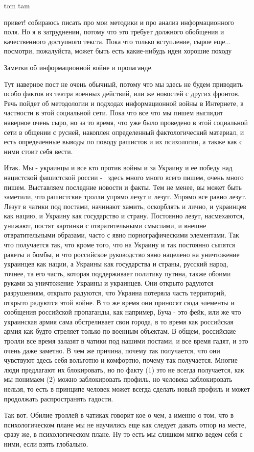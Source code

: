  
 
 
 
 

tom tam

привет! собираюсь писать про мои методики и про анализ информационного поля. Но
я в затруднении, потому что это требует должного обобщения и качественного
доступного текста. Пока что только вступление, сырое еще... посмотри,
пожалуйста, может быть есть какие-нибудь идеи хорошие походу

Заметки об информационной войне и пропаганде.

Тут наверное пост не очень обычный, потому что мы здесь не будем приводить
особо фактов из театра военных действий, или же новостей с других фронтов. Речь
пойдет об методологии и подходах информационной войны в Интернете, в частности
в этой социальной сети. Пока что все что мы пишем выглядит наверное очень сыро,
но за то время, что уже было проведено в этой социальной сети в общении с
русней, накоплен определенный фактологический материал, и есть определенные
выводы по поводу рашистов и их психологии, а также как с ними стоит себя
вести.

Итак. Мы - украинцы и все кто против войны и за Украину и ее победу над
нацистской фашистской россии -  здесь много много всего пишем, очень много
пишем. Выставляем последние новости и факты. Тем не менее, вы может быть
заметили, что рашистские тролли упрямо лезут и лезут. Упрямо
все равно лезут. Лезут в чатики под постами, начинают хамить, оскорблять и
лично, и украинцев как нацию, и Украину как государство и страну. Постоянно
лезут, насмехаются, унижают, постят картинки с отвратительными смыслами, и
внешне отвратительными образами, часто с явно порнографическими элементами. Так
что получается так, что кроме того, что на Украину и так постоянно сыпятся
ракеты и бомбы, и что российское руководство явно нацелено на уничтожение
украинцев как нации, а Украины как государства и страны, русский народ, точнее,
та его часть, которая поддерживает политику путина, также обоими руками за
уничтожение Украины и украинцев. Они открыто радуются разрушениям, открыто
радуются, что Украина потеряла часть территорий, открыто радуются этой войне. В
то же время они приносят сюда элементы и сообщения российской пропаганды, как
например, Буча - это фейк, или же что украинская армия сама обстреливает свои
города, в то время как российская армия как будто стреляет только по военным
объектам. В общем, российские тролли все время залазят в чатики под нашими
постами, и все время гадят, и это очень даже заметно. В чем же причина, почему
так получается, что они чувствуют здесь себя вольготно и комфортно, почему так
получается. Многие люди предлагают их блокировать, но по факту (1) это не
всегда получается, как мы понимаем (2) можно заблокировать профиль, но человека
заблокировать нельзя, то есть в принципе человек может всегда сделать новый
профиль и может продолжать распространять гадости. 

Так вот. Обилие троллей в чатиках говорит кое о чем, а именно о том, что в
психологическом плане мы не научились еще как следует давать отпор на месте,
сразу же, в психологическом плане. Ну то есть мы слишком мягко ведем себя с
ними, если взять глобально. 
